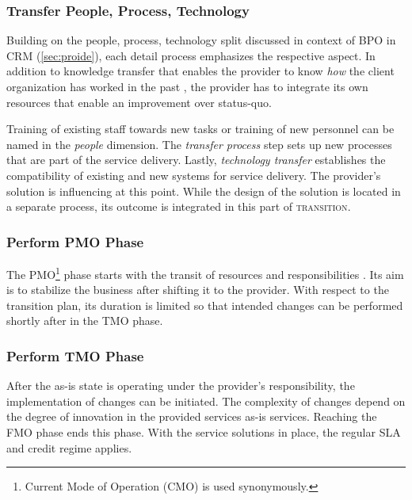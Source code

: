 	\subsubsection{Transfer People, Process, Technology}
	
	Building on the people, process, technology split discussed in context of  \acrshort{BPO} in \acrshort{CRM} (\cf \ref{sec:proide}), each detail process emphasizes the respective aspect. In addition to knowledge transfer that enables the provider to know \textit{how} the client organization has worked in the past \citep{perunovic2007outsourcing}, the provider has to integrate its own resources that enable an improvement over status-quo.
	
	 Training of existing staff towards new tasks or training of new personnel can be named in the \textit{people} dimension. The \textit{transfer process} step sets up new processes that are part of the service delivery. Lastly, \textit{technology transfer} establishes the compatibility of existing and new systems for service delivery. The provider's solution is influencing at this point. While the design of the solution is located in a separate process, its outcome is integrated in this part of \textsc{transition}. 
	
	\subsubsection{Perform \acrshort{PMO} Phase}
	The \acrshort{PMO}\footnote{Current Mode of Operation (CMO) is used synonymously. } phase starts with the transit of resources and responsibilities \citep{bitkom2008}. Its aim is to stabilize the business after shifting it to the provider. With respect to the transition plan, its duration is limited so that intended changes can be performed shortly after in the \acrshort{TMO} phase.
	
	\subsubsection{Perform \acrshort{TMO} Phase}
	After the as-is state is operating under the provider's responsibility, the implementation of changes can be initiated. The complexity of changes depend on the degree of innovation in the provided services \wrt as-is services. Reaching the \acrshort{FMO} phase ends this phase. With the service solutions in place, the regular \acrshort{SLA} and credit regime applies.
	
	
	
